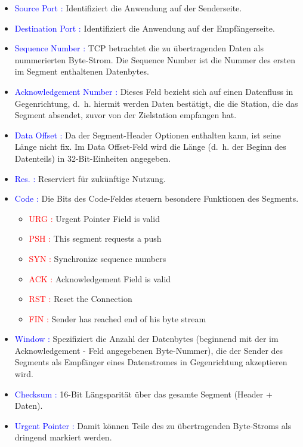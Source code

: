 \begin{itemize}
    \item \textcolor{blue}{Source Port :} Identifiziert die Anwendung auf der Senderseite.
    \item \textcolor{blue}{Destination Port :} Identifiziert die Anwendung auf der Empfängerseite.
    \item \textcolor{blue}{Sequence Number :} TCP betrachtet die zu übertragenden Daten als nummerierten Byte-Strom.
    Die Sequence Number ist die Nummer des ersten im Segment enthaltenen Datenbytes.
    \item \textcolor{blue}{Acknowledgement Number :} Dieses Feld bezieht sich auf einen Datenfluss in Gegenrichtung, d.\ h. hiermit werden Daten bestätigt, die die Station, die das Segment absendet, zuvor von der Zielstation empfangen hat.
    \item \textcolor{blue}{Data Offset :} Da der Segment-Header Optionen enthalten kann, ist seine Länge nicht fix.
    Im Data Offset-Feld wird die Länge (d.\ h. der Beginn des Datenteils) in 32-Bit-Einheiten angegeben.
    \item \textcolor{blue}{Res. :} Reserviert für zukünftige Nutzung.
    \item \textcolor{blue}{Code :} Die Bits des Code-Feldes steuern besondere Funktionen des Segments.
    \begin{itemize}
        \item \textcolor{red}{URG :} Urgent Pointer Field is valid
        \item \textcolor{red}{PSH :} This segment requests a push
        \item \textcolor{red}{SYN :} Synchronize sequence numbers
        \item \textcolor{red}{ACK :} Acknowledgement Field is valid
        \item \textcolor{red}{RST :} Reset the Connection
        \item \textcolor{red}{FIN :} Sender has reached end of his byte stream
    \end{itemize}
    \item \textcolor{blue}{Window :} Spezifiziert die Anzahl der Datenbytes (beginnend mit der im Acknowledgement - Feld angegebenen Byte-Nummer), die der Sender des Segments als Empfänger eines Datenstromes in Gegenrichtung akzeptieren wird.
    \item \textcolor{blue}{Checksum :} 16-Bit Längsparität über das gesamte Segment (Header + Daten).
    \item \textcolor{blue}{Urgent Pointer :} Damit können Teile des zu übertragenden Byte-Stroms als dringend markiert werden.
\end{itemize}

